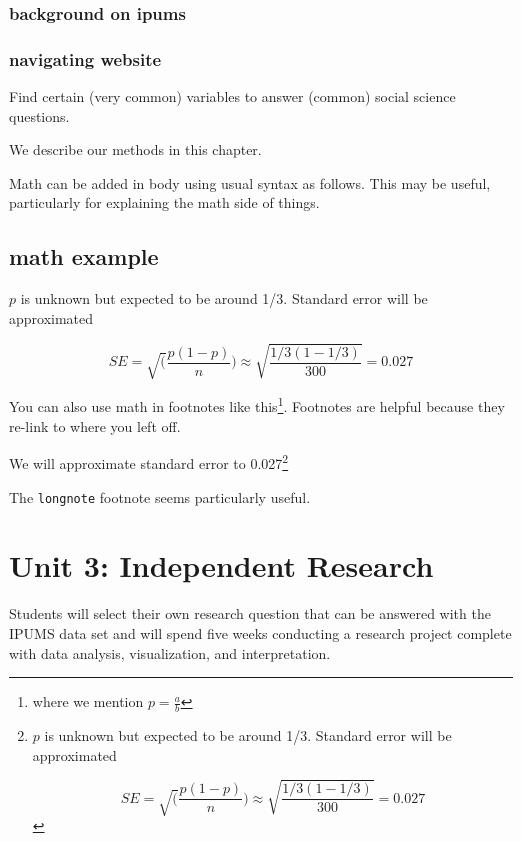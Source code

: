 \documentclass[
]{book}
\begin{document}
\hypertarget{background-on-ipums}{%
\subsection{background on ipums}\label{background-on-ipums}}

\hypertarget{navigating-website}{%
\subsection{navigating website}\label{navigating-website}}

Find certain (very common) variables to answer (common) social science questions.

We describe our methods in this chapter.

Math can be added in body using usual syntax as follows. This may be useful, particularly for explaining the math side of things.

\hypertarget{math-example}{%
\section{math example}\label{math-example}}

\(p\) is unknown but expected to be around 1/3. Standard error will be approximated

\[
SE = \sqrt(\frac{p(1-p)}{n}) \approx \sqrt{\frac{1/3 (1 - 1/3)} {300}} = 0.027
\]

You can also use math in footnotes like this\footnote{where we mention \(p = \frac{a}{b}\)}. Footnotes are helpful because they re-link to where you left off.

We will approximate standard error to 0.027\footnote{\(p\) is unknown but expected to be around 1/3. Standard error will be approximated

  \[
  SE = \sqrt(\frac{p(1-p)}{n}) \approx \sqrt{\frac{1/3 (1 - 1/3)} {300}} = 0.027
  \]}

The \texttt{longnote} footnote seems particularly useful.

\hypertarget{unit3}{%
\chapter{Unit 3: Independent Research}\label{unit3}}

Students will select their own research question that can be answered with the IPUMS data set and will spend five weeks conducting a research project complete with data analysis, visualization, and interpretation.
\end{document}
